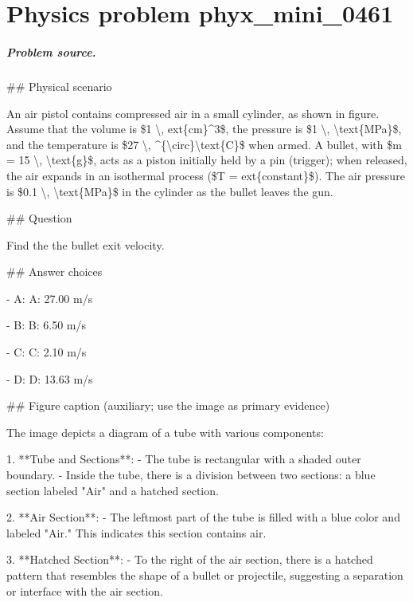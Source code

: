 
\chapter{Physics problem phyx\_mini\_0461}
\label{ch:PhyXMiniProblems_problem_phyx_mini_0461}

\paragraph{Problem source.}
\#\# Physical scenario

An air pistol contains compressed air in a small cylinder, as shown in figure. Assume that the volume is \$1 \textbackslash{}, 	ext\{cm\}\textasciicircum{}3\$, the pressure is \$1 \textbackslash{}, \textbackslash{}text\{MPa\}\$, and the temperature is \$27 \textbackslash{}, \textasciicircum{}\{\textbackslash{}circ\}\textbackslash{}text\{C\}\$ when armed. A bullet, with \$m = 15 \textbackslash{}, \textbackslash{}text\{g\}\$, acts as a piston initially held by a pin (trigger); when released, the air expands in an isothermal process (\$T = 	ext\{constant\}\$). The air pressure is \$0.1 \textbackslash{}, \textbackslash{}text\{MPa\}\$ in the cylinder as the bullet leaves the gun.

\#\# Question

Find the the bullet exit velocity.

\#\# Answer choices

- A: A: 27.00 m/s

- B: B: 6.50 m/s

- C: C: 2.10 m/s

- D: D: 13.63 m/s

\#\# Figure caption (auxiliary; use the image as primary evidence)

The image depicts a diagram of a tube with various components:

1. **Tube and Sections**:
   - The tube is rectangular with a shaded outer boundary.
   - Inside the tube, there is a division between two sections: a blue section labeled "Air" and a hatched section.

2. **Air Section**:
   - The leftmost part of the tube is filled with a blue color and labeled "Air." This indicates this section contains air.

3. **Hatched Section**:
   - To the right of the air section, there is a hatched pattern that resembles the shape of a bullet or projectile, suggesting a separation or interface with the air section.

